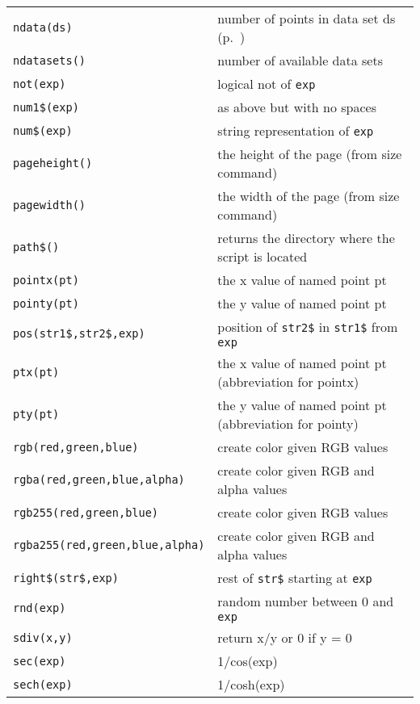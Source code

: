 \begin{supertabular}{ll}
{\tt ndata(ds)}            & number of points in data set ds (p.~\pageref{ndata})\\
{\tt ndatasets()}      & number of available data sets\\
{\tt not(exp)}          	& logical not of {\tt exp} \\
{\tt num1\$(exp)}    	& as above but with no spaces \\
{\tt num\$(exp)}      	& string representation of {\tt exp} \\
{\tt pageheight()}  & the height of the page (from size command) \\
{\tt pagewidth()} 	& the width of the page (from size command) \\
{\tt path\$()}          & returns the directory where the script is located \\
{\tt pointx(pt)}     	& the x value of named point pt \\
{\tt pointy(pt)}     	& the y value of named point pt \\
{\tt pos(str1\$,str2\$,exp)}      & position of {\tt str2\$} in {\tt str1\$} from {\tt exp} \\
{\tt ptx(pt)}           	& the x value of named point pt (abbreviation for pointx) \\
{\tt pty(pt)}          	& the y value of named point pt (abbreviation for pointy)\\
{\tt rgb(red,green,blue)}   & create color given RGB values \\
{\tt rgba(red,green,blue,alpha)}   & create color given RGB and alpha values \\
{\tt rgb255(red,green,blue)}   & create color given RGB values \\
{\tt rgba255(red,green,blue,alpha)}   & create color given RGB and alpha values \\
{\tt right\$(str\$,exp)}      & rest of {\tt str\$} starting at {\tt exp} \\
{\tt rnd(exp)}          	& random number between 0 and {\tt exp} \\
{\tt sdiv(x,y)} 	     	& return x/y or 0 if y = 0 \\
{\tt sec(exp)} 	     	& 1/cos(exp) \\
{\tt sech(exp)}        	& 1/cosh(exp) \\

\end{supertabular}
